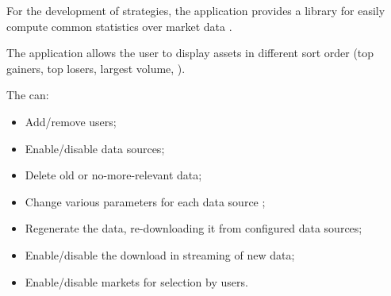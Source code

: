 For the development of strategies, the application provides a library for easily
compute common statistics over market data .

The application allows the user to display assets in different sort order (top
gainers, top losers, largest volume, \etc).

The  can:

\begin{itemize}
	\item Add/remove users;
	\item Enable/disable data sources;
	\item Delete old or no-more-relevant data;
	\item Change various parameters for each data source ;
	\item Regenerate the data, re-downloading it from configured data
		sources;
	\item Enable/disable the download in streaming of new data;
	\item Enable/disable markets for selection by users.
\end{itemize}
